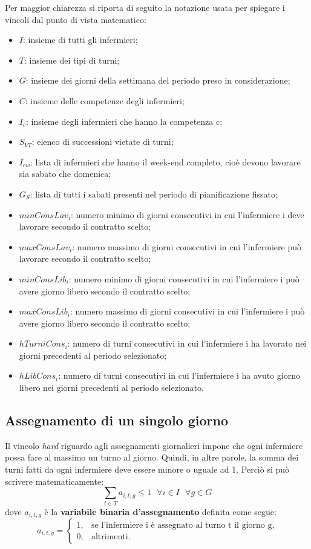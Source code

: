Per maggior chiarezza si riporta di seguito la notazione usata per spiegare i vincoli dal punto di vista matematico:
\begin{itemize}
\item $I$: insieme di tutti gli infermieri;
\item $T$: insieme dei tipi di turni;
\item $G$: insieme dei giorni della settimana del periodo preso in considerazione;
\item $C$: insieme delle competenze degli infermieri;
\item $I_c$: insieme degli infermieri che hanno la competenza c;
\item $S_{VT}$: elenco di successioni vietate di turni;
\item $I_{cw}$: lista di infermieri che hanno il week-end completo, cioè devono lavorare sia sabato che domenica;
\item $G_S$: lista di tutti i sabati presenti nel periodo di pianificazione fissato;
\item $minConsLav_i$: numero minimo di giorni consecutivi in cui l'infermiere i deve lavorare secondo il contratto scelto;
\item $maxConsLav_i$: numero massimo di giorni consecutivi in cui l'infermiere può lavorare secondo il contratto scelto;
\item $minConsLib_i$: numero minimo di giorni consecutivi in cui l'infermiere i può avere giorno libero secondo il contratto scelto;
\item $maxConsLib_i$: numero massimo di giorni consecutivi in cui l'infermiere i può avere giorno libero secondo il contratto scelto;
\item $hTurniCons_i$: numero di turni consecutivi in cui l'infermiere i ha lavorato nei giorni precedenti al periodo selezionato;
\item $hLibCons_i$: numero di turni consecutivi in cui l'infermiere i ha avuto giorno libero nei giorni precedenti al periodo selezionato.
\end{itemize}

\subsection{Assegnamento di un singolo giorno}
Il vincolo \textit{hard} riguardo agli assegnamenti giornalieri impone che ogni infermiere possa fare al massimo un turno al giorno. Quindi, in altre parole, la somma dei turni fatti da ogni infermiere deve essere minore o uguale ad 1. Perciò si può scrivere matematicamente:
\begin{equation}
\sum_{t \in T} a_{i, t, g} \leq 1 ~~~ \forall i \in I ~~~ \forall g \in G
\end{equation}
dove $a_{i, t, g}$ è la \textbf{variabile binaria d'assegnamento} definita come segue:
\begin{equation}
\label{eq:varAssegnamento}
a_{i, t, g}=
\begin{cases}
1, & \text{se l'infermiere i è assegnato al turno t il giorno g,} \\
0, & \text{altrimenti.}
\end{cases}
\end{equation}


